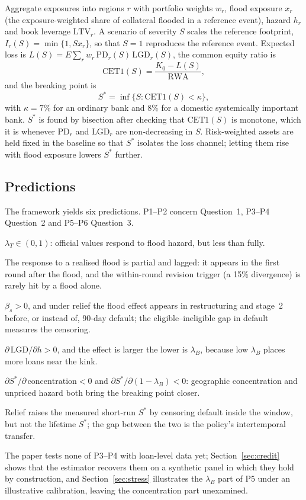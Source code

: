 Aggregate exposures into regions $r$ with portfolio weights $w_r$, flood exposure $x_r$ (the exposure-weighted share of collateral flooded in a reference event), hazard $h_r$ and book leverage $\mathrm{LTV}_r$. A scenario of severity $S$ scales the reference footprint, $I_r(S) = \min\{1, S x_r\}$, so that $S = 1$ reproduces the reference event. Expected loss is $L(S) = E \sum_r w_r\,\mathrm{PD}_r(S)\,\mathrm{LGD}_r(S)$, the common equity ratio is
\begin{equation}
\mathrm{CET1}(S) = \frac{K_0 - L(S)}{\mathrm{RWA}},
\end{equation}
and the breaking point is
\begin{equation}
S^* = \inf\{S : \mathrm{CET1}(S) < \kappa\},
\label{eq:sstar}
\end{equation}
with $\kappa = 7\%$ for an ordinary bank and $8\%$ for a domestic systemically important bank. $S^*$ is found by bisection after checking that $\mathrm{CET1}(S)$ is monotone, which it is whenever $\mathrm{PD}_r$ and $\mathrm{LGD}_r$ are non-decreasing in $S$. Risk-weighted assets are held fixed in the baseline so that $S^*$ isolates the loss channel; letting them rise with flood exposure lowers $S^*$ further.

\subsection{Predictions}

The framework yields six predictions. P1--P2 concern Question~1, P3--P4 Question~2 and P5--P6 Question~3.
\begin{description}[style=nextline,leftmargin=1.6em]
\item[P1] $\lambda_T \in (0, 1)$: official values respond to flood hazard, but less than fully.
\item[P2] The response to a realised flood is partial and lagged: it appears in the first round after the flood, and the within-round revision trigger (a 15\% divergence) is rarely hit by a flood alone.
\item[P3] $\beta_s > 0$, and under relief the flood effect appears in restructuring and stage~2 before, or instead of, 90-day default; the eligible--ineligible gap in default measures the censoring.
\item[P4] $\partial\,\mathrm{LGD}/\partial h > 0$, and the effect is larger the lower is $\lambda_B$, because low $\lambda_B$ places more loans near the kink.
\item[P5] $\partial S^*/\partial\,\mathrm{concentration} < 0$ and $\partial S^*/\partial (1 - \lambda_B) < 0$: geographic concentration and unpriced hazard both bring the breaking point closer.
\item[P6] Relief raises the measured short-run $S^*$ by censoring default inside the window, but not the lifetime $S^*$; the gap between the two is the policy's intertemporal transfer.
\end{description}

The paper tests none of P3--P4 with loan-level data yet; Section~\ref{sec:credit} shows that the estimator recovers them on a synthetic panel in which they hold by construction, and Section~\ref{sec:stress} illustrates the $\lambda_B$ part of P5 under an illustrative calibration, leaving the concentration part unexamined.
